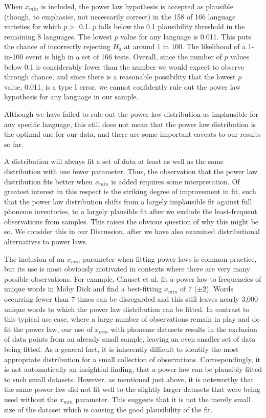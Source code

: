 When \(x_{min}\) is included, the power law hypothesis is accepted as plausible (though, to emphasise, not necessarily correct) in the 158 of 166 language varieties for which \(p >\) 0.1. \(p\) falls below the 0.1 plausibility threshold in the remaining 8 languages. The lowest \(p\) value for any language is 0.011. This puts the chance of incorrectly rejecting \(H_0\) at around 1 in 100. The likelihood of a 1-in-100 event is high in a set of 166 tests. Overall, since the number of \(p\) values below 0.1 is considerably fewer than the number we would expect to observe through chance, and since there is a reasonable possibility that the lowest \(p\) value, 0.011, is a type I error, we cannot confidently rule out the power law hypothesis for any language in our sample.

Although we have failed to rule out the power law distribution as implausible for any specific language, this still does not mean that the power law distribution is the optimal one for our data, and there are some important caveats to our results so far.

A distribution will always fit a set of data at least as well as the same distribution with one fewer parameter. Thus, the observation that the power law distribution fits better when \(x_{min}\) is added requires some interpretation. Of greatest interest in this respect is the striking degree of improvement in fit, such that the power law distribution shifts from a largely implausible fit against full phoneme inventories, to a largely plausible fit after we exclude the least-frequent observations from samples. This raises the obvious question of why this might be so. We consider this in our Discussion, after we have also examined distributional alternatives to power laws.

The inclusion of an \(x_{min}\) parameter when fitting power laws is common practice, but its use is most obviously motivated in contexts where there are very many possible observations. For example, Clauset et al. \autocite*[p.~684]{clauset_power-law_2009} fit a power law to frequencies of unique words in Moby Dick and find a best-fitting \(x_{min}\) of 7 (\(\pm2\)). Words occurring fewer than 7 times can be disregarded and this still leaves nearly 3,000 unique words to which the power law distribution can be fitted. In contrast to this typical use case, where a large number of observations remain in play and do fit the power law, our use of \(x_{min}\) with phoneme datasets results in the exclusion of data points from an already small sample, leaving an even smaller set of data being fitted. As a general fact, it is inherently difficult to identify the most appropriate distribution for a small collection of observations. Correspondingly, it is not automatically an insightful finding, that a power law can be plausibly fitted to such small datasets. However, as mentioned just above, it is noteworthy that the same power law did not fit well to the slightly larger datasets that were being used without the \(x_{min}\) parameter. This suggests that it is not the merely small size of the dataset which is causing the good plausibility of the fit.

